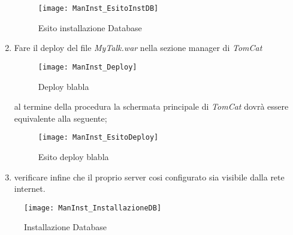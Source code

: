 \begin{enumerate}
\begin{figure}[H]
  \texttt{[image: ManInst\_EsitoInstDB]}
\caption{Esito installazione Database}\label{fig:EsitoInstDB}
\end{figure}


\item Fare il deploy del file \textit{MyTalk.war} nella sezione manager di \textit{TomCat}

\begin{figure}[H]
  \texttt{[image: ManInst\_Deploy]}
\caption{Deploy blabla}\label{fig:Deploy}
\end{figure}

al termine della procedura la schermata principale di \textit{TomCat} dovrà essere equivalente alla seguente;

\begin{figure}[H]
  \texttt{[image: ManInst\_EsitoDeploy]}
\caption{Esito deploy blabla}\label{fig:EsitoDeploy}
\end{figure}


\item verificare infine che il proprio server cosi configurato sia visibile dalla rete internet.
\end{enumerate}

\begin{figure}[H]
  \texttt{[image: ManInst\_InstallazioneDB]}
\caption{Installazione Database}\label{fig:InstallazioneDB}
\end{figure}



